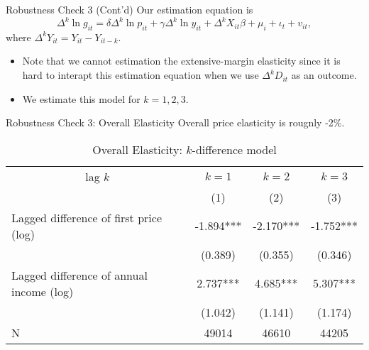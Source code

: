 \documentclass[
  ignorenonframetext,
]{beamer}
\providecommand{\tightlist}{%
  \setlength{\itemsep}{0pt}\setlength{\parskip}{0pt}}
\begin{document}
\begin{frame}{Robustness Check 3 (Cont'd)}
\protect\hypertarget{robustness-check-3-contd}{}
Our estimation equation is
\[\Delta^k \ln g_{it} = \delta \Delta^k \ln p_{it} + \gamma \Delta^k \ln y_{it} + \Delta^k X_{it} \beta + \mu_i + \iota_t + v_{it},\]
where \(\Delta^k Y_{it} = Y_{it} - Y_{it-k}\).

\begin{itemize}
\tightlist
\item
  Note that we cannot estimation the extensive-margin elasticity since it is hard to interapt this estimation equation when we use \(\Delta^k D_{it}\) as an outcome.
\item
  We estimate this model for \(k = 1, 2, 3\).
\end{itemize}
\end{frame}

\begin{frame}{Robustness Check 3: Overall Elasticity}
\protect\hypertarget{robustness-check-3-overall-elasticity}{}
Overall price elasticity is rougnly -2\%.

\begin{table}

\caption{\label{tab:kablekDiffElasticitySlide1}Overall Elasticity: $k$-difference model}
\centering
\fontsize{8}{10}\selectfont
\begin{tabular}[t]{lccc}
\toprule
\multicolumn{1}{c}{lag $k$} & \multicolumn{1}{c}{$k = 1$} & \multicolumn{1}{c}{$k = 2$} & \multicolumn{1}{c}{$k = 3$} \\
\cmidrule(l{3pt}r{3pt}){1-1} \cmidrule(l{3pt}r{3pt}){2-2} \cmidrule(l{3pt}r{3pt}){3-3} \cmidrule(l{3pt}r{3pt}){4-4}
 & (1) & (2) & (3)\\
\midrule
Lagged difference of first price (log) & -1.894*** & -2.170*** & -1.752***\\
 & (0.389) & (0.355) & (0.346)\\
Lagged difference of annual income (log) & 2.737*** & 4.685*** & 5.307***\\
 & (1.042) & (1.141) & (1.174)\\
N & 49014 & 46610 & 44205\\
\bottomrule
\end{tabular}
\end{table}
\end{frame}
\end{document}
